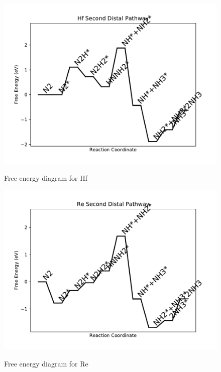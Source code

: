 \documentclass{article}
\begin{document}
\newpage
\begin{figure}
\includegraphics[width=1\linewidth]{data/plots/Hf_distal_2.pdf}
\label{fig:Hf_distal_2}
\caption{Free energy diagram for Hf}
\end{figure}

\begin{figure}
\includegraphics[width=1\linewidth]{data/plots/Re_distal_2.pdf}
\label{fig:Re_distal_2}
\caption{Free energy diagram for Re}
\end{figure}
\end{document}
